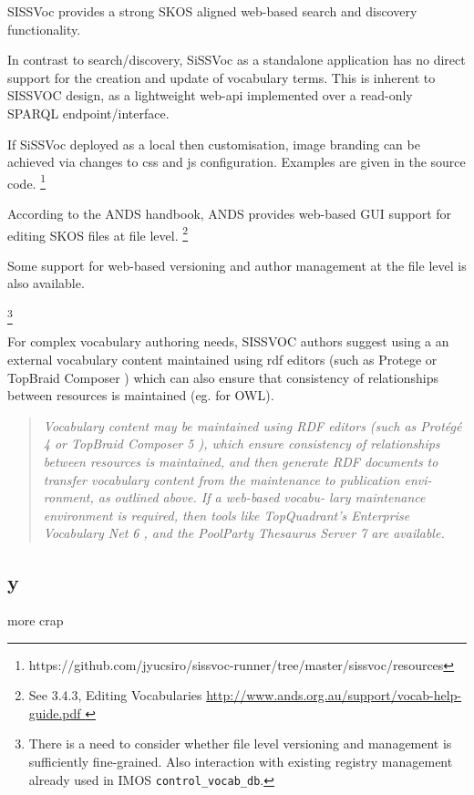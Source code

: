 \documentclass[10pt,a4paper]{article}
\newenvironment{italicquotes}
{\begin{quote}\itshape}
{\end{quote}}
\begin{document}
\begin{flushleft}
\begin{italicquotes}
  \end{italicquotes} 


  SISSVoc provides a strong SKOS aligned web-based search and discovery functionality. 

  In contrast to search/discovery, SiSSVoc as a standalone application has no direct 
  support for the creation and update of vocabulary terms.  This is inherent to SISSVOC design, as a 
  lightweight web-api implemented over a read-only SPARQL endpoint/interface.  

  If SiSSVoc deployed as a local then customisation, image branding
  can be achieved via changes to css and js configuration.
  Examples are given in the source code.
   \footnote {
      https://github.com/jyucsiro/sissvoc-runner/tree/master/sissvoc/resources
    }
    
  According to the ANDS handbook, ANDS provides web-based GUI support for editing SKOS files at file level. 
  \footnote { See 3.4.3, Editing Vocabularies \url{ http://www.ands.org.au/support/vocab-help-guide.pdf } 
  }

  Some support for web-based versioning and author management at the file level
  is also available. 

  \footnote {
    There is a need to consider whether file level versioning and management is
  sufficiently fine-grained. Also interaction with existing registry management
  already used in IMOS \texttt{control\_vocab\_db}. 
  }
  
 

  For complex vocabulary authoring needs, SISSVOC authors suggest using a an external vocabulary content maintained using rdf
editors (such as Protege or TopBraid Composer ) which can also ensure that consistency of
relationships between resources is maintained (eg. for OWL). 

  \begin{italicquotes} 
  Vocabulary content may be maintained using RDF editors (such as Protégé 4 or
TopBraid Composer 5 ), which ensure consistency of
relationships between resources is maintained, and
then generate RDF documents to transfer vocabulary
content from the maintenance to publication envi-
ronment, as outlined above. If a web-based vocabu-
lary maintenance environment is required, then tools
like TopQuadrant’s Enterprise Vocabulary Net 6 , and
the PoolParty Thesaurus Server 7 are available.
  \end{italicquotes} 


\subsection{y}
  more crap



\end{flushleft}
\end{document}
